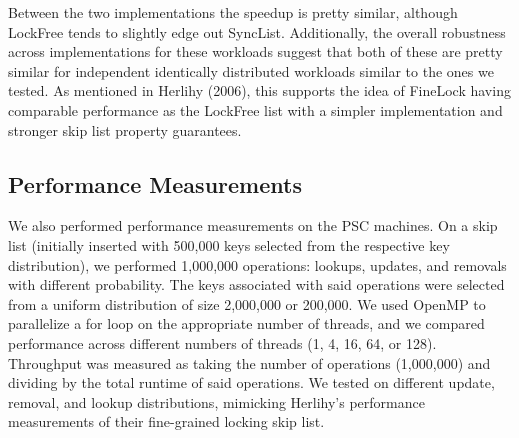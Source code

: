 \documentclass[11pt]{article}
\begin{document}
Between the two implementations the speedup is pretty similar, although LockFree tends to slightly edge out SyncList. Additionally, the overall robustness across implementations for these workloads suggest that both of these are pretty similar for independent identically distributed workloads similar to the ones we tested. As mentioned in Herlihy (2006), this supports the idea of FineLock having comparable performance as the LockFree list with a simpler implementation and stronger skip list property guarantees.\cite{herlihy2006provably}
\subsection{Performance Measurements}
We also performed performance measurements on the PSC machines. On a skip list (initially inserted with 500,000 keys selected from the respective key distribution), we performed 1,000,000 operations: lookups, updates, and removals with different probability. The keys associated with said operations were selected from a uniform distribution of size 2,000,000 or 200,000. We used OpenMP to parallelize a for loop on the appropriate number of threads, and we compared performance across different numbers of threads (1, 4, 16, 64, or 128). Throughput was measured as taking the number of operations (1,000,000) and dividing by the total runtime of said operations. We tested on different update, removal, and lookup distributions, mimicking Herlihy's performance measurements of their fine-grained locking skip list.\cite{herlihy2006provably} 
\end{document}
